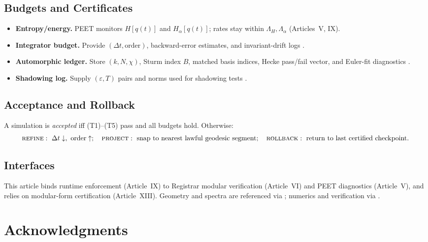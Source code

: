 \documentclass[12pt]{amsart}
\theoremstyle{plain}
\begin{document}
\subsection{Budgets and Certificates}
\begin{itemize}
  \item \textbf{Entropy/energy.} PEET monitors $H[q(t)]$ and $H_\alpha[q(t)]$; rates stay within $\Lambda_H,\Lambda_\alpha$ (Articles~V, IX).
  \item \textbf{Integrator budget.} Provide $(\Delta t,\text{order})$, backward-error estimates, and invariant-drift logs \cite{hairer2006geometric}.
  \item \textbf{Automorphic ledger.} Store $(k,N,\chi)$, Sturm index $B$, matched basis indices, Hecke pass/fail vector, and Euler-fit diagnostics \cite{sturm1987congruence,diamond2005first}.
  \item \textbf{Shadowing log.} Supply $(\varepsilon,T)$ pairs and norms used for shadowing tests \cite{pilyugin1999shadowing}.
\end{itemize}

\subsection{Acceptance and Rollback}
A simulation is \emph{accepted} iff (T1)–(T5) pass and all budgets hold. Otherwise:
\[
\textsc{refine}:\ \Delta t\downarrow,\ \text{order}\uparrow;\quad
\textsc{project}:\ \text{snap to nearest lawful geodesic segment};\quad
\textsc{rollback}:\ \text{return to last certified checkpoint.}
\]

\subsection{Interfaces}
This article binds runtime enforcement (Article~IX) to Registrar modular verification (Article~VI) and PEET diagnostics (Article~V), and relies on modular-form certification (Article~XIII). Geometry and spectra are referenced via \cite{katok1992fuchsian,iwaniec2002spectral}; numerics and verification via \cite{trotter1959product,suzuki1976generalized,hairer2006geometric,pilyugin1999shadowing,clarke1999model,baier2008model}.

\newpage
\section*{Acknowledgments}
\end{document}
